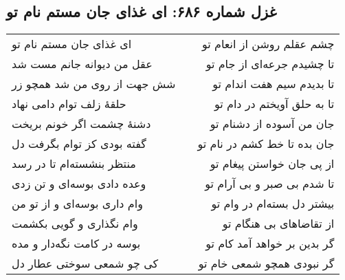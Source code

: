 \begin{center}
\section*{غزل شماره ۶۸۶: ای غذای جان مستم نام تو}
\label{sec:686}
\begin{longtable}{l p{0.5cm} r}
ای غذای جان مستم نام تو
&&
چشم عقلم روشن از انعام تو
\\
عقل من دیوانه جانم مست شد
&&
تا چشیدم جرعه‌ای از جام تو
\\
شش جهت از روی من شد همچو زر
&&
تا بدیدم سیم هفت اندام تو
\\
حلقهٔ زلف توام دامی نهاد
&&
تا به حلق آویختم در دام تو
\\
دشنهٔ چشمت اگر خونم بریخت
&&
جان من آسوده از دشنام تو
\\
گفته بودی کز توام بگرفت دل
&&
جان بده تا خط کشم در نام تو
\\
منتظر بنشسته‌ام تا در رسد
&&
از پی جان خواستن پیغام تو
\\
وعده دادی بوسه‌ای و تن زدی
&&
تا شدم بی صبر و بی آرام تو
\\
وام داری بوسه‌ای و از تو من
&&
بیشتر دل بسته‌ام در وام تو
\\
وام نگذاری و گویی بکشمت
&&
از تقاضاهای بی هنگام تو
\\
بوسه در کامت نگه‌دار و مده
&&
گر بدین بر خواهد آمد کام تو
\\
کی چو شمعی سوختی عطار دل
&&
گر نبودی همچو شمعی خام تو
\\
\end{longtable}
\end{center}
